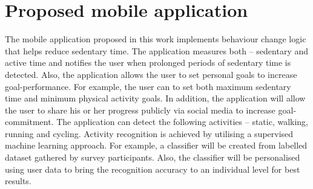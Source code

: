 \section{Proposed mobile application}
\label{section:proposed-application}
The mobile application proposed in this work implements behaviour change logic that helps reduce sedentary time. The application measures both – sedentary and active time and notifies the user when prolonged periods of sedentary time is detected. Also, the application allows the user to set personal goals to increase goal-performance. For example, the user can to set both maximum sedentary time and minimum physical activity goals. In addition, the application will allow the user to share his or her progress publicly via social media to increase goal-commitment. The application can detect the following activities – static, walking, running and cycling. Activity recognition is achieved by utilising a supervised machine learning approach. For example, a classifier will be created from labelled dataset gathered by survey participants. Also, the classifier will be personalised using user data to bring the recognition accuracy to an individual level for best results. 